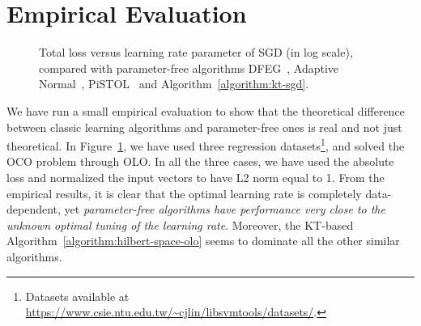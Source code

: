 \section{Empirical Evaluation}

\begin{figure}[t]
\centering
{}
\caption{\footnotesize{Total loss versus learning rate parameter of \ac{SGD} (in log scale), compared with parameter-free algorithms DFEG~\cite{Orabona-2013}, Adaptive Normal~\cite{McMahan-Orabona-2014}, PiSTOL~\cite{Orabona-2014} and Algorithm~\ref{algorithm:kt-sgd}.}}
\label{figure:experiments-olo}
\end{figure}

We have run a small empirical evaluation to show that the theoretical
difference between classic learning algorithms and parameter-free ones is real
and not just theoretical. In Figure~\ref{figure:experiments-olo}, we have used
three regression datasets\footnote{Datasets available at
\url{https://www.csie.ntu.edu.tw/~cjlin/libsvmtools/datasets/}.}, and solved
the \ac{OCO} problem through \ac{OLO}. In all the three cases, we have used the
absolute loss and normalized the input vectors to have L2 norm equal to 1. From
the empirical results, it is clear that the optimal learning rate is completely
data-dependent, yet \emph{parameter-free algorithms have performance very close
to the unknown optimal tuning of the learning rate}. Moreover, the KT-based
Algorithm~\ref{algorithm:hilbert-space-olo} seems to dominate all the other
similar algorithms.
